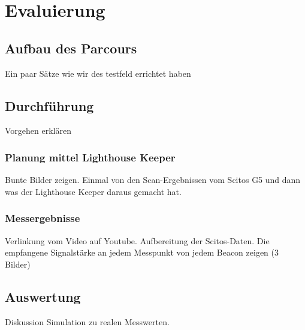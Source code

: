 \chapter{Evaluierung}

\section{Aufbau des Parcours}
Ein paar Sätze wie wir des testfeld errichtet haben 

\section{Durchführung}
Vorgehen erklären
\subsection{Planung mittel Lighthouse Keeper}
Bunte Bilder zeigen. Einmal von den Scan-Ergebnissen vom Scitos G5 und dann was der Lighthouse Keeper daraus gemacht hat.
\subsection{Messergebnisse}
Verlinkung vom Video auf Youtube. Aufbereitung der Scitos-Daten. Die empfangene Signalstärke an jedem Messpunkt von jedem Beacon zeigen (3 Bilder)

\section{Auswertung}
Diskussion Simulation zu realen Messwerten.

